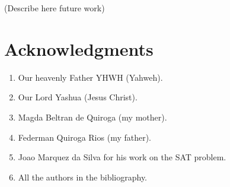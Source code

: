 \documentclass{easychair}
\begin{document}
(Describe here future work)

\section{Acknowledgments}
\label{sect:acknowledgments}

\begin{enumerate}
\item
Our heavenly Father YHWH (Yahweh).

\item
Our Lord Yashua (Jesus Christ).

\item
Magda Beltran de Quiroga (my mother).

\item
Federman Quiroga Rios (my father).

\item
Joao Marquez da Silva for his work on the SAT problem.

\item
All the authors in the bibliography.

\end{enumerate}

\label{sect:bib}

%
%
%


\end{document}
